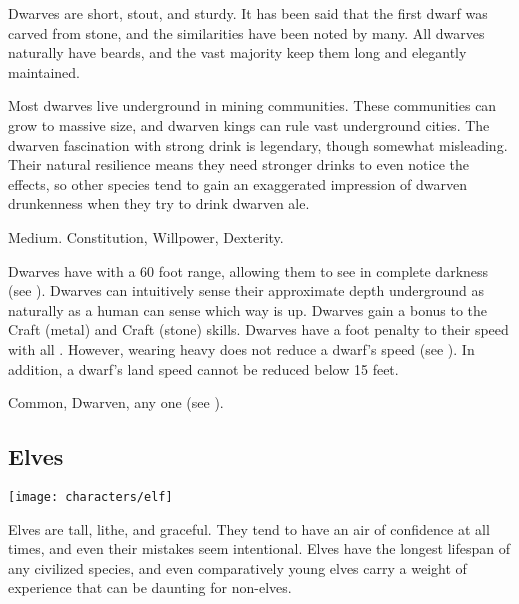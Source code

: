         Dwarves are short, stout, and sturdy.
        It has been said that the first dwarf was carved from stone, and the similarities have been noted by many.
        All dwarves naturally have beards, and the vast majority keep them long and elegantly maintained.

        Most dwarves live underground in mining communities.
        These communities can grow to massive size, and dwarven kings can rule vast underground cities.
        The dwarven fascination with strong drink is legendary, though somewhat misleading.
        Their natural resilience means they need stronger drinks to even notice the effects, so other species tend to gain an exaggerated impression of dwarven drunkenness when they try to drink dwarven ale.

         Medium.
          Constitution,  Willpower,  Dexterity.
        \begin{raggeditemize}
             Dwarves have  with a 60 foot range, allowing them to see in complete darkness (see ).
             Dwarves can intuitively sense their approximate depth underground as naturally as a human can sense which way is up.
             Dwarves gain a  bonus to the Craft (metal) and Craft (stone) skills.
             Dwarves have a  foot penalty to their speed with all .
                However, wearing heavy  does not reduce a dwarf's speed (see ).
                In addition, a dwarf's land speed cannot be reduced below 15 feet.
        \end{raggeditemize}
         Common, Dwarven, any one  (see ).

    \subsection{Elves}
        \texttt{[image: characters/elf]}

        Elves are tall, lithe, and graceful.
        They tend to have an air of confidence at all times, and even their mistakes seem intentional.
        Elves have the longest lifespan of any civilized species, and even comparatively young elves carry a weight of experience that can be daunting for non-elves.

